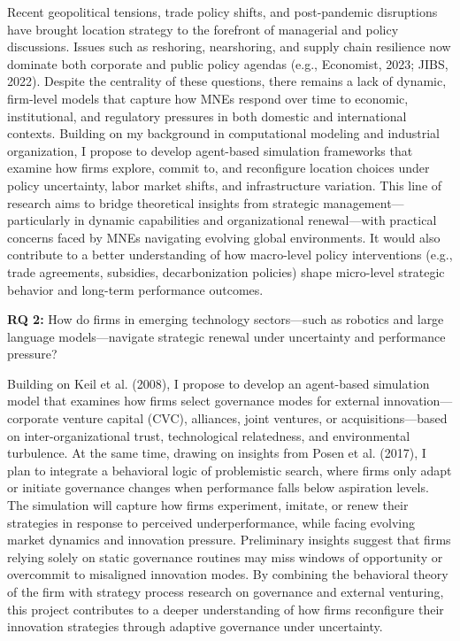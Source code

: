 \documentclass[11pt,a4paper]{article}
\begin{document}
Recent geopolitical tensions, trade policy shifts, and post-pandemic disruptions have brought location strategy to the forefront of managerial and policy discussions. Issues such as reshoring, nearshoring, and supply chain resilience now dominate both corporate and public policy agendas (e.g., Economist, 2023; JIBS, 2022). Despite the centrality of these questions, there remains a lack of dynamic, firm-level models that capture how MNEs respond over time to economic, institutional, and regulatory pressures in both domestic and international contexts. Building on my background in computational modeling and industrial organization, I propose to develop agent-based simulation frameworks that examine how firms explore, commit to, and reconfigure location choices under policy uncertainty, labor market shifts, and infrastructure variation. This line of research aims to bridge theoretical insights from strategic management—particularly in dynamic capabilities and organizational renewal—with practical concerns faced by MNEs navigating evolving global environments. It would also contribute to a better understanding of how macro-level policy interventions (e.g., trade agreements, subsidies, decarbonization policies) shape micro-level strategic behavior and long-term performance outcomes.

\textbf{RQ 2:} How do firms in emerging technology sectors—such as robotics and large language models—navigate strategic renewal under uncertainty and performance pressure?

Building on Keil et al. (2008), I propose to develop an agent-based simulation model that examines how firms select governance modes for external innovation—corporate venture capital (CVC), alliances, joint ventures, or acquisitions—based on inter-organizational trust, technological relatedness, and environmental turbulence. At the same time, drawing on insights from Posen et al. (2017), I plan to integrate a behavioral logic of problemistic search, where firms only adapt or initiate governance changes when performance falls below aspiration levels. The simulation will capture how firms experiment, imitate, or renew their strategies in response to perceived underperformance, while facing evolving market dynamics and innovation pressure. Preliminary insights suggest that firms relying solely on static governance routines may miss windows of opportunity or overcommit to misaligned innovation modes. By combining the behavioral theory of the firm with strategy process research on governance and external venturing, this project contributes to a deeper understanding of how firms reconfigure their innovation strategies through adaptive governance under uncertainty.
\end{document}
